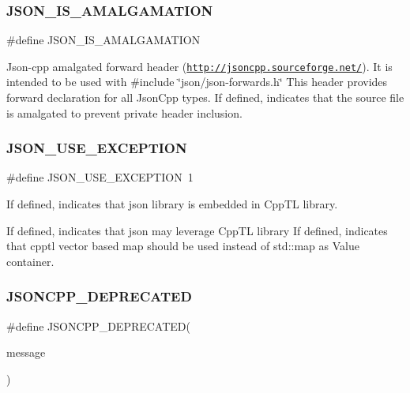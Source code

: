 \subsubsection{\texorpdfstring{J\+S\+O\+N\+\_\+\+I\+S\+\_\+\+A\+M\+A\+L\+G\+A\+M\+A\+T\+I\+ON}{JSON\_IS\_AMALGAMATION}}
{\footnotesize\ttfamily \#define J\+S\+O\+N\+\_\+\+I\+S\+\_\+\+A\+M\+A\+L\+G\+A\+M\+A\+T\+I\+ON}

Json-\/cpp amalgated forward header (\href{http://jsoncpp.sourceforge.net/}{\tt http\+://jsoncpp.\+sourceforge.\+net/}). It is intended to be used with \#include \char`\"{}json/json-\/forwards.\+h\char`\"{} This header provides forward declaration for all Json\+Cpp types. If defined, indicates that the source file is amalgated to prevent private header inclusion. \mbox{\label{json-forwards_8h_a51968e67b1462ac893f87a0fc8b791cd_a51968e67b1462ac893f87a0fc8b791cd}} 
\subsubsection{\texorpdfstring{J\+S\+O\+N\+\_\+\+U\+S\+E\+\_\+\+E\+X\+C\+E\+P\+T\+I\+ON}{JSON\_USE\_EXCEPTION}}
{\footnotesize\ttfamily \#define J\+S\+O\+N\+\_\+\+U\+S\+E\+\_\+\+E\+X\+C\+E\+P\+T\+I\+ON~1}



If defined, indicates that json library is embedded in Cpp\+TL library. 

If defined, indicates that json may leverage Cpp\+TL library If defined, indicates that cpptl vector based map should be used instead of std\+::map as Value container. \mbox{\label{json-forwards_8h_a6933a4321aa03c8a29016669073f1af6_a6933a4321aa03c8a29016669073f1af6}} 
\subsubsection{\texorpdfstring{J\+S\+O\+N\+C\+P\+P\+\_\+\+D\+E\+P\+R\+E\+C\+A\+T\+ED}{JSONCPP\_DEPRECATED}}
{\footnotesize\ttfamily \#define J\+S\+O\+N\+C\+P\+P\+\_\+\+D\+E\+P\+R\+E\+C\+A\+T\+ED(\begin{DoxyParamCaption}\item[{}]{message }\end{DoxyParamCaption})}

